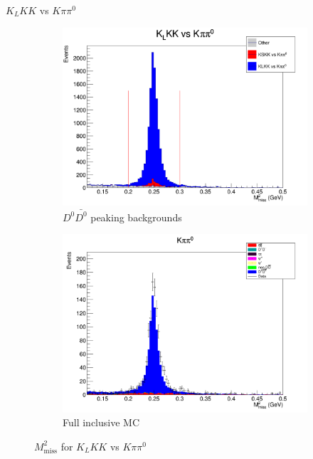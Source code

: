 \documentclass{beamer}
\begin{document}
\begin{frame}{$K_LKK$ vs $K\pi\pi^0$}
  \begin{figure}
    \centering
    \begin{subfigure}{0.5\textwidth}
      \centering
      \includegraphics[width=\textwidth]{KLKKVersusKpipi0Peaking.png}
      \caption{$D^0\bar{D^0}$ peaking backgrounds}
    \end{subfigure}%
    \begin{subfigure}{0.5\textwidth}
      \centering
      \includegraphics[width=\textwidth]{KLKKVersusKpipi0DataInclusiveMC.png}
      \caption{Full inclusive MC}
    \end{subfigure}
    \caption{$M^2_\text{miss}$ for $K_LKK$ vs $K\pi\pi^0$}
  \end{figure}
\end{frame}
\end{document}
